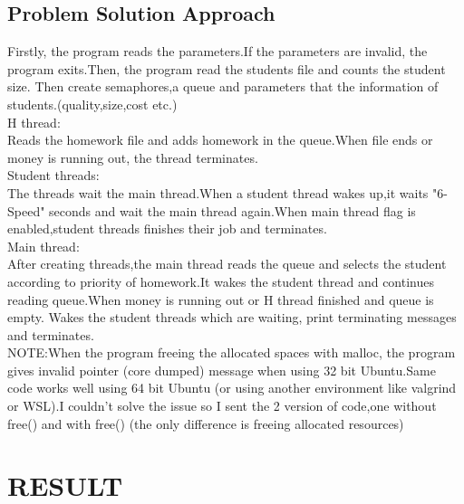 \documentclass[12pt]{article}
\begin{document}
\subsection{Problem Solution Approach}
Firstly, the program reads the parameters.If the parameters are invalid, the program exits.Then, the program read the students file and counts the student size. Then create semaphores,a queue and parameters that the information of students.(quality,size,cost etc.)\\
H thread:\\
Reads the homework file and adds homework in the queue.When file ends or money is running out, the thread terminates.\\
Student threads:\\
The threads wait the main thread.When a student thread wakes up,it waits "6-Speed" seconds and wait the main thread again.When main thread flag is enabled,student threads finishes their job and terminates.\\
Main thread:\\
After creating threads,the main thread reads the queue and selects the student according to priority of homework.It wakes the student thread and continues reading queue.When money is running out or H thread finished and queue is empty. Wakes the student threads which are waiting, print terminating messages and terminates.\\
NOTE:When the program freeing the allocated spaces with malloc, the program gives invalid pointer (core dumped) message when using 32 bit Ubuntu.Same code works well using 64 bit Ubuntu (or using another environment like valgrind or WSL).I couldn't solve the issue so I sent the 2 version of code,one without free() and with free() (the only difference is freeing allocated resources)\\
\section{RESULT}
\end{document}
